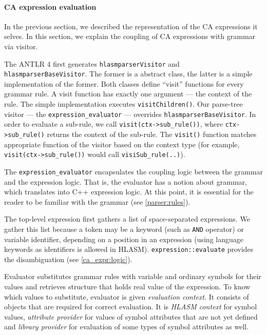 \paragraph{CA expression evaluation}
\label{ca_expr:eval}

In the previous section, we described the representation of the CA expressions it selves. In this section, we explain the coupling of CA expressions with grammar via visitor. 

The ANTLR 4 first generates \texttt{hlasmparserVisitor} and \texttt{hlasmparserBaseVisitor}. The former is a abstract class, the latter is a simple implementation of the former. Both classes define ``visit'' functions for every grammar rule. A visit function has exactly one argument --- the context of the rule. The simple implementation executes \texttt{visitChildren()}. Our parse-tree visitor --- the \texttt{expression\_evaluator} --- overrides \texttt{hlasmparserBaseVisitor}. In order to evaluate a sub-rule, we call \texttt{visit(ctx->sub\_rule())}, where \texttt{ctx->sub\_rule()} returns the context of the sub-rule. The \texttt{visit()} function matches appropriate function of the visitor based on the context type (for example, \texttt{visit(ctx->sub\_rule())} would call \texttt{visiSub\_rule(..)}).

The \texttt{expression\_evaluator} encapsulates the coupling logic between the grammar and the expression logic. That is, the evaluator has a notion about grammar, which translates into C++ expression logic. At this point, it is essential for the reader to be familiar with the grammar (see \cref{parser:rules}).

The top-level expression first gathers a list of space-separated expressions. We gather this list because a token may be a keyword (such as \texttt{AND} operator) or variable identifier, depending on a position in an expression (using language keywords as identifiers is allowed in HLASM). \texttt{expression::evaluate} provides the disambiguation (see \cref{ca_expr:logic}). 

Evaluator substitutes grammar rules with variable and ordinary symbols for their values and retrieves structure that holds real value of the expression. To know which values to substitute, evaluator is given \emph{evaluation context}. It consists of objects that are required for correct evaluation. It is \emph{HLASM context} for symbol values, \emph{attribute provider} for values of symbol attributes that are not yet defined and \emph{library provider} for evaluation of some types of symbol attributes as well.

